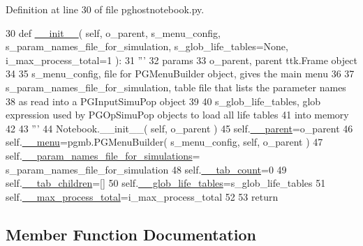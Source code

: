 Definition at line 30 of file pghostnotebook.\+py.


\begin{DoxyCode}
30     \textcolor{keyword}{def }\hyperlink{classnegui_1_1pghostnotebook_1_1PGHostNotebook_a6194250626f96f1f6c2b6ccd48aa5e92}{\_\_init\_\_}( self, o\_parent, s\_menu\_config, s\_param\_names\_file\_for\_simulation, 
      s\_glob\_life\_tables=None, i\_max\_process\_total=1 ):
31         \textcolor{stringliteral}{'''}
32 \textcolor{stringliteral}{        params }
33 \textcolor{stringliteral}{        o\_parent, parent ttk.Frame object}
34 \textcolor{stringliteral}{}
35 \textcolor{stringliteral}{        s\_menu\_config, file for PGMenuBuilder object, gives the main menu}
36 \textcolor{stringliteral}{}
37 \textcolor{stringliteral}{        s\_param\_names\_file\_for\_simulation, table file that lists the parameter names}
38 \textcolor{stringliteral}{           as read into a PGInputSimuPop object}
39 \textcolor{stringliteral}{}
40 \textcolor{stringliteral}{        s\_glob\_life\_tables, glob expression used by PGOpSimuPop objects to load all life tables}
41 \textcolor{stringliteral}{            into memory}
42 \textcolor{stringliteral}{}
43 \textcolor{stringliteral}{        '''}
44         Notebook.\_\_init\_\_( self, o\_parent )
45         self.\hyperlink{classnegui_1_1pghostnotebook_1_1PGHostNotebook_ae3a4078b5e41c208da268dfee99bb622}{\_\_parent}=o\_parent
46         self.\hyperlink{classnegui_1_1pghostnotebook_1_1PGHostNotebook_add1ab1bb7f792ff733e8236fed00218c}{\_\_menu}=pgmb.PGMenuBuilder( s\_menu\_config, self, o\_parent )
47         self.\hyperlink{classnegui_1_1pghostnotebook_1_1PGHostNotebook_a9b145ef56ff954c480d856859fcda86e}{\_\_param\_names\_file\_for\_simulations}=
      s\_param\_names\_file\_for\_simulation
48         self.\hyperlink{classnegui_1_1pghostnotebook_1_1PGHostNotebook_a84a7417cc57500cbe5c230449ba464b3}{\_\_tab\_count}=0
49         self.\hyperlink{classnegui_1_1pghostnotebook_1_1PGHostNotebook_aa3a7876014bd06be174732b7d814bfa8}{\_\_tab\_children}=[]
50         self.\hyperlink{classnegui_1_1pghostnotebook_1_1PGHostNotebook_af63d9ae9cde1ec2155d4dc81934d00c7}{\_\_glob\_life\_tables}=s\_glob\_life\_tables
51         self.\hyperlink{classnegui_1_1pghostnotebook_1_1PGHostNotebook_a14287e3e1cf5c33d9be0ff28d031fc04}{\_\_max\_process\_total}=i\_max\_process\_total
52 
53         \textcolor{keywordflow}{return}
\end{DoxyCode}


\subsection{Member Function Documentation}
